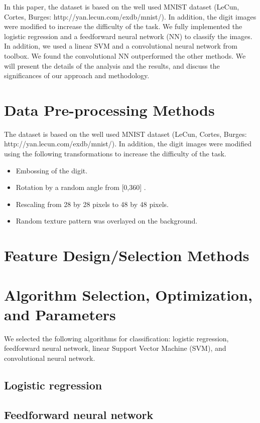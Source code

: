 \documentclass[conference]{IEEEtran}
\begin{document}
In this paper, the dataset is based on the well used MNIST dataset (LeCun, Cortes, Burges: http://yan.lecun.com/exdb/mnist/). In addition, the digit images were modified to increase the difficulty of the task. We fully implemented the logistic regression and a feedforward neural network (NN) to classify the images. In addition, we used a linear SVM and a convolutional neural network from toolbox. We found the convolutional NN outperformed the other methods. We will present the details of the analysis and the results, and discuss the significances of our approach and methodology.

\section{Data Pre-processing Methods}
The dataset is based on the well used MNIST dataset (LeCun, Cortes, Burges: http://yan.lecun.com/exdb/mnist/).  In addition, the digit images were modified using the following transformations to increase the difficulty of the task.
\begin{itemize}
\item Embossing of the digit.
\item Rotation by a random angle from [0,360] \degree.
\item Rescaling from 28 by 28 pixels to 48 by 48 pixels.
\item Random texture pattern was overlayed on the background.
\end{itemize}

\section{Feature Design/Selection Methods}


\section{Algorithm Selection, Optimization, and Parameters}
We selected the following algorithms for classification: logistic regression, feedforward neural network, linear Support Vector Machine (SVM), and convolutional neural network.
\subsection{Logistic regression}

\subsection{Feedforward neural network}
\end{document}
